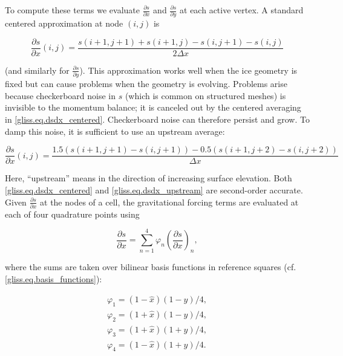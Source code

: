 To compute these terms we evaluate $\frac{\partial s}{\partial x}$ and $\frac{\partial s}{\partial y}$
at each active vertex.  A standard centered approximation at node $(i,j)$ is

\begin{equation}
  \label{gliss.eq.dsdx_centered}
  \frac{\partial s}{\partial x}(i,j) = \frac{s(i+1,j+1)+s(i+1,j)-s(i,j+1)-s(i,j)}{2\Delta x}
\end{equation}

\noindent
(and similarly for $\frac{\partial s}{\partial y}$). This approximation works
well when the ice geometry is fixed but can cause problems when the geometry is evolving.
Problems arise because checkerboard noise in $s$ (which is common on structured meshes)
is invisible to the momentum balance; it is canceled out by the centered averaging in \eqref{gliss.eq.dsdx_centered}.
Checkerboard noise can therefore persist and grow.  To damp this noise, it is sufficient to use an upstream average:

\begin{equation}
  \label{gliss.eq.dsdx_upstream}
  \frac{\partial s}{\partial x}(i,j) = \frac{1.5 (s(i+1,j+1) - s(i,j+1)) - 0.5 (s(i+1,j+2) - s(i,j+2))}{\Delta x}
\end{equation}

\noindent
Here, ``upstream'' means in the direction of increasing surface elevation. Both \eqref{gliss.eq.dsdx_centered}
and \eqref{gliss.eq.dsdx_upstream} are second-order accurate.
Given $\frac{\partial s}{\partial x}$ at the nodes of a cell,
the gravitational forcing terms are evaluated at each of four quadrature points using

\begin{equation}
  \frac{\partial s}{\partial x} = \sum\limits_{n=1}^{4}{{{\varphi }_{n}}}{{\left( \frac{\partial s}{\partial x} \right)}_{n}},
\end{equation}

\noindent
where the sums are taken over bilinear basis functions in reference squares (cf. \eqref{gliss.eq.basis_functions}):

\begin{equation}
  \label{gliss.eq.basis_functions_2d}
  \begin{matrix}
    {{\varphi }_{1}}=(1-\hat{x})(1-\hat{y})/4,  \\[3pt]
    {{\varphi }_{2}}=(1+\hat{x})(1-\hat{y})/4,  \\[3pt]
    {{\varphi }_{3}}=(1+\hat{x})(1+\hat{y})/4,  \\[3pt]
    {{\varphi }_{4}}=(1-\hat{x})(1+\hat{y})/4.
  \end{matrix}
\end{equation} 

